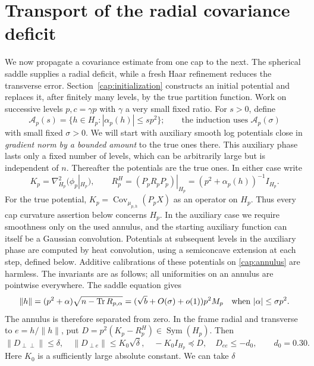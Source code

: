 \section{Transport of the radial covariance deficit}\label{cap:multiscale}
We now propagate a covariance estimate from one cap to the next. The
spherical saddle supplies a radial deficit, while a fresh Haar refinement
reduces the transverse error. Section~\ref{cap:initialization} constructs an
initial potential and replaces it, after finitely many levels, by the true
partition function. Work on successive levels \(p,c=\gamma p\) with
\(\gamma\) a very small fixed ratio. For \(s>0\), define
\begin{equation}
 \mathcal A_p(s)=\{h\in H_p:|\alpha_p(h)|\le s p^2\};
 \qquad\text{the induction uses }\mathcal A_p(\sigma)
 \label{cap:annulus}
\end{equation}
with small fixed \(\sigma>0\). We will start with auxiliary smooth log
potentials close in \emph{gradient norm by a bounded amount} to the true ones
there. This auxiliary phase lasts only a fixed number of levels, which can be
arbitrarily large but is independent of \(n\). Thereafter the potentials are
the true ones. In either case write
\[
 K_p=\nabla_{H_p}^2(\phi_p|_{H_p}),\qquad
 R_p^H=(P_pR_pP_p)|_{H_p}=(p^2+\alpha_p(h))^{-1}I_{H_p}.
\]
For the true potential,
\(K_p=\operatorname{Cov}_{\mu_{p,h}}(P_pX)\) as an operator on \(H_p\).
Thus every cap curvature assertion below concerns \(H_p\). In
the auxiliary case we require smoothness only on the used annulus, and the
starting auxiliary function can itself be a Gaussian convolution. Potentials
at subsequent levels in the auxiliary phase are computed by heat convolution,
using a semiconcave extension at each step, defined below. Additive
calibrations of these potentials on \eqref{cap:annulus} are harmless. The
invariants are as follows; all uniformities on an annulus are pointwise
everywhere. The saddle equation gives
\[
 \|h\|=(p^2+\alpha)\sqrt{n-\operatorname{Tr} R_{p,\alpha}}
       =(\sqrt b+O(\sigma)+o(1))p^2M_p
       \quad\text{when }|\alpha|\le\sigma p^2 .
\]
The annulus is therefore separated from zero. In the frame radial and
transverse to \(e=h/\|h\|\), put
\(D=p^2(K_p-R_p^H)\in\operatorname{Sym}(H_p)\). Then
\begin{equation}
 \|D_{\perp\perp}\|\le\delta,\quad
 \|D_{\perp e}\|\le K_0\sqrt\delta,\quad
       -K_0 I_{H_p}\preceq D,\quad D_{ee}\le-d_0,\qquad d_0=0.30 .
 \label{cap:invariant}
\end{equation}
Here \(K_0\) is a sufficiently large absolute constant. We can take \(\delta\)

